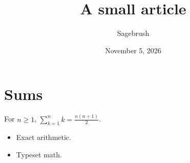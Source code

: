 \documentclass{article}
\title{A small article}
\author{Sagebrush}
\date{November 5, 2026}
\begin{document}
\maketitle
\section{Sums}
For $n \ge 1$, $\sum_{k=1}^{n} k = \frac{n(n+1)}{2}$.
\begin{itemize}
\item Exact arithmetic.
\item Typeset math.
\end{itemize}
\end{document}
